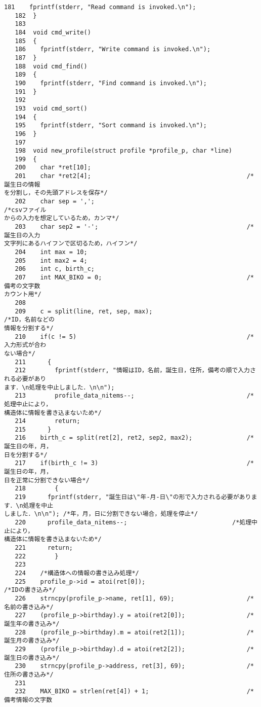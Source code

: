 \begin{Verbatim}[fontsize=\small, baselinestretch=0.8]
   181	  fprintf(stderr, "Read command is invoked.\n");
   182	}
   183	
   184	void cmd_write()
   185	{
   186	  fprintf(stderr, "Write command is invoked.\n");
   187	}
   188	void cmd_find()
   189	{
   190	  fprintf(stderr, "Find command is invoked.\n");
   191	}
   192	
   193	void cmd_sort()
   194	{
   195	  fprintf(stderr, "Sort command is invoked.\n");
   196	}
   197	
   198	void new_profile(struct profile *profile_p, char *line)
   199	{
   200	  char *ret[10];
   201	  char *ret2[4];                                           /*誕生日の情報
を分割し，その先頭アドレスを保存*/
   202	  char sep = ',';                                          /*csvファイル
からの入力を想定しているため，カンマ*/
   203	  char sep2 = '-';                                         /*誕生日の入力
文字列にあるハイフンで区切るため，ハイフン*/
   204	  int max = 10;
   205	  int max2 = 4;
   206	  int c, birth_c;
   207	  int MAX_BIKO = 0;                                        /*備考の文字数
カウント用*/
   208	  
   209	  c = split(line, ret, sep, max);                          /*ID，名前などの
情報を分割する*/
   210	  if(c != 5)                                               /*入力形式が合わ
ない場合*/
   211	    {
   212	      fprintf(stderr, "情報はID，名前，誕生日，住所，備考の順で入力される必要があり
ます．\n処理を中止しました．\n\n");
   213	      profile_data_nitems--;                               /*処理中止により，
構造体に情報を書き込まないため*/
   214	      return;
   215	    }
   216	  birth_c = split(ret[2], ret2, sep2, max2);               /*誕生日の年，月，
日を分割する*/
   217	  if(birth_c != 3)                                         /*誕生日の年，月，
日を正常に分割できない場合*/
   218	      {
   219		fprintf(stderr, "誕生日は\"年-月-日\"の形で入力される必要があります．\n処理を中止
しました．\n\n"); /*年，月，日に分割できない場合，処理を停止*/
   220		profile_data_nitems--;                             /*処理中止により，
構造体に情報を書き込まないため*/
   221		return;
   222	      }
   223	
   224	  /*構造体への情報の書き込み処理*/
   225	  profile_p->id = atoi(ret[0]);                            /*IDの書き込み*/
   226	  strncpy(profile_p->name, ret[1], 69);                    /*名前の書き込み*/
   227	  (profile_p->birthday).y = atoi(ret2[0]);                 /*誕生年の書き込み*/
   228	  (profile_p->birthday).m = atoi(ret2[1]);                 /*誕生月の書き込み*/
   229	  (profile_p->birthday).d = atoi(ret2[2]);                 /*誕生日の書き込み*/
   230	  strncpy(profile_p->address, ret[3], 69);                 /*住所の書き込み*/
   231	
   232	  MAX_BIKO = strlen(ret[4]) + 1;                           /*備考情報の文字数

\end{Verbatim}
